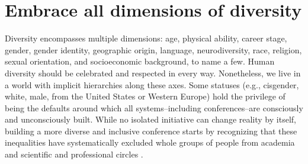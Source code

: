 \documentclass[10pt,letterpaper]{article}
\begin{document}



\section{Embrace all dimensions of diversity}
\label{rule_diversity}

Diversity encompasses multiple dimensions: age, physical ability, career stage, gender, gender identity, geographic origin, language, neurodiversity, race, religion, sexual orientation, and socioeconomic background, to name a few.
Human diversity should be celebrated and respected in every way. Nonetheless, we live in a world with implicit hierarchies along these axes. Some statuses (e.g., cisgender, white, male, from the United States or Western Europe) hold the privilege of being the defaults around which all systems--including conferences--are consciously and unconsciously built. 
While no isolated initiative can change reality by itself, building a more diverse and inclusive conference starts by recognizing that these inequalities have systematically excluded whole groups of people from academia and scientific and professional circles \cite{timperleyHeMoanaPukepuke2020}. 
\end{document}
